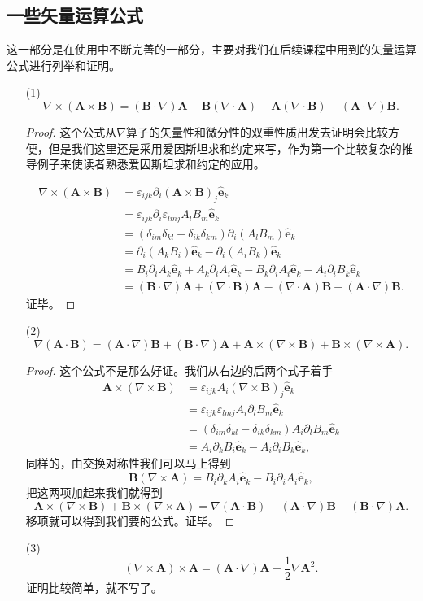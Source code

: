 \documentclass[UTF8]{ctexbook}
\renewcommand{\b}{\boldsymbol}
\newtheorem{proof}{证明}
\numberwithin{equation}{chapter}
\begin{document}
	
	\subsection{一些矢量运算公式}
	这一部分是在使用中不断完善的一部分，主要对我们在后续课程中用到的矢量运算公式进行列举和证明。
	\begin{itemize}
		\item[(1)]
		\[\nabla\times(\b{A}\times\b{B})=(\b{B}\cdot\nabla)\b{A}-\b{B}(\nabla\cdot\b{A})+\b{A}(\nabla\cdot\b{B})-(\b{A}\cdot\nabla)\b{B}.\]
		 \begin{proof}
		 	这个公式从$\nabla$算子的矢量性和微分性的双重性质出发去证明会比较方便，但是我们这里还是采用爱因斯坦求和约定来写，作为第一个比较复杂的推导例子来使读者熟悉爱因斯坦求和约定的应用。
		 	
		 	\begin{align*}
		 		\nabla\times(\b{A}\times\b{B})&=\varepsilon_{ijk}\partial_i(\b{A}\times\b{B})_j\hat{\b{e}}_k \\
		 		&=\varepsilon_{ijk}\partial_i\varepsilon_{lmj}A_lB_m\hat{\b{e}}_k \\
		 		&=(\delta_{im}\delta_{kl}-\delta_{ik}\delta_{km})\partial_i(A_lB_m)\hat{\b{e}}_k \\ 
		 		&=\partial_i(A_kB_i)\hat{\b{e}}_k - \partial_i (A_iB_k)\hat{\b{e}}_k \\
		 		&=B_i\partial_iA_k\hat{\b{e}}_k+A_k\partial_iA_i\hat{\b{e}}_k-B_k\partial_iA_i\hat{\b{e}}_k-A_i\partial_iB_k\hat{\b{e}}_k \\
		 		&=(\b{B}\cdot\nabla)\b{A}+(\nabla\cdot\b{B})\b{A}-(\nabla\cdot\b{A})\b{B}-(\b{A}\cdot\nabla)\b{B}.
		 	\end{align*}
	 		证毕。
		 \end{proof}
	 
	 	\item[(2)]
	 	\[\nabla(\b{A}\cdot\b{B})=(\b{A}\cdot\nabla)\b{B}+(\b{B}\cdot\nabla)\b{A}+\b{A}\times(\nabla\times\b{B})+\b{B}\times(\nabla\times\b{A}).\]
	 	\begin{proof}
	 		这个公式不是那么好证。我们从右边的后两个式子着手
	 		\begin{align*}
	 			\b{A}\times(\nabla\times\b{B})&=\varepsilon_{ijk}A_i(\nabla\times\b{B})_j\hat{\b{e}}_k \\ 
	 			&= \varepsilon_{ijk}\varepsilon_{lmj}A_i\partial_lB_m\hat{\b{e}}_k \\
	 			&= (\delta_{im}\delta_{kl}-\delta_{ik}\delta_{km})A_i\partial_lB_m\hat{\b{e}}_k \\
	 			&= A_i\partial_kB_i\hat{\b{e}}_k-A_i\partial_iB_k\hat{\b{e}}_k,
	 		\end{align*}
 			同样的，由交换对称性我们可以马上得到
 			\[\b{B}(\nabla\times\b{A})=B_i\partial_kA_i\hat{\b{e}}_k-B_i\partial_iA_i\hat{\b{e}}_k,\]
 			把这两项加起来我们就得到
 			\[\b{A}\times(\nabla\times\b{B})+\b{B}\times(\nabla\times\b{A})=\nabla(\b{A}\cdot\b{B})-(\b{A}\cdot\nabla)\b{B}-(\b{B}\cdot\nabla)\b{A}.\]
 			移项就可以得到我们要的公式。证毕。
	 	\end{proof}
 		
 		\item[(3)]
 		\[(\nabla\times\b{A})\times\b{A}=(\b{A}\cdot\nabla)\b{A}-\frac{1}{2}\nabla\b{A}^2.\]
 		证明比较简单，就不写了。
	\end{itemize}
	
\end{document}
